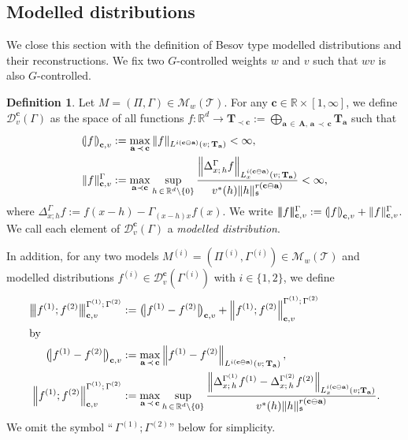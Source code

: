 \documentclass[10pt]{amsart}
\theoremstyle{definition}
\newtheorem{defi}[theo]{Definition}
\numberwithin{equation}{section}
\newcommand{\bbR}{\mathbb{R}}
\newcommand{\mfs}{\mathfrak{s}}
\newcommand{\vco}{v^*}
\newcommand{\bfa}{\mathbf{a}}
\newcommand{\bfc}{\mathbf{c}}
\newcommand{\bfcoa}{\mathbf{c}\ominus\mathbf{a}}
\newcommand{\bfA}{\mathbf{A}}
\newcommand{\bfT}{\mathbf{T}}
\newcommand{\mcD}{\mathcal{D}}
\newcommand{\scT}{\mathscr{T}}
\newcommand{\scM}{\mathscr{M}}
\newcommand{\tri}{|\!|\!|}
\newcommand{\llparenthesis}{\mathopen{(\mkern -2.7mu|}}
\newcommand{\rrparenthesis}{\mathclose{|\mkern -2.7mu)}}
\newcommand{\llbigparenthesis}{\mathopen{\big(\mkern -2.7mu\big|}}
\newcommand{\rrbigparenthesis}{\mathclose{\big|\mkern -2.7mu\big)}}
\newcommand{\lbp}{\llbigparenthesis}
\newcommand{\rbp}{\rrbigparenthesis}
\newcommand{\lp}{\llparenthesis}
\newcommand{\rp}{\rrparenthesis}
\newcommand{\bigtri}{\big|\mkern -2.7mu\big|\mkern -2.7mu\big|}
\begin{document}
\subsection{Modelled distributions}

We close this section with the definition of Besov type modelled distributions and their reconstructions. We fix two $G$-controlled weights $w$ and $v$ such that $wv$ is also $G$-controlled.


\begin{defi}\label{def:besovMD}
Let $M=(\Pi,\Gamma)\in\scM_{w}(\scT)$. For any $\bfc\in\bbR\times[1,\infty]$, we define $\mcD_{v}^\bfc(\Gamma)$ as the space of all functions $f:\bbR^d\to \bfT_{\prec \bfc}:=\bigoplus_{\bfa\,\in\,\bfA,\, \bfa\,\prec \,\bfc}\bfT_\bfa$ such that
\begin{align*}
\lp f\rp_{\bfc,v}&:=\max_{\bfa\,\prec \,\bfc}\|f\|_{L^{i(\bfcoa)}(v;\,\bfT_\bfa)}<\infty,\\
\| f\|_{\bfc,v}^\Gamma&:=\max_{\bfa\prec\bfc}
\sup_{h\,\in\,\bbR^d\setminus\{0\}}
\frac{\left\|\Delta_{x;\,h}^\Gamma f\right\|_{L_x^{i(\bfcoa)}(v;\,\bfT_\bfa)}}{\vco(h)\|h\|_\mfs^{r(\bfcoa)}}<\infty,
\end{align*}
where $\Delta_{x;h}^\Gamma f:=f(x-h)-\Gamma_{(x-h)x}f(x)$. We write $\tri f\tri_{\bfc,v}^\Gamma:=\lp f\rp_{\bfc,v}+\|f\|_{\bfc,v}^\Gamma$. We call each element of $\mcD_v^{\bfc}(\Gamma)$ a \emph{modelled distribution}.

In addition, for any two models $M^{(i)}=(\Pi^{(i)},\Gamma^{(i)})\in\scM_{w}(\scT)$ and modelled distributions $f^{(i)}\in\mcD_{v}^\bfc(\Gamma^{(i)})$ with $i\in\{1,2\}$, we define
\begin{align*}
\bigtri f^{(1)};f^{(2)}\bigtri_{\bfc,v}^{\Gamma^{(1)};\,\Gamma^{(2)}} &:=\lbp f^{(1)}-f^{(2)}\rbp_{\bfc,v}+\left\|f^{(1)};f^{(2)}\right\|_{\bfc,v}^{\Gamma^{(1)};\,\Gamma^{(2)}}
\\
\intertext{by}
\lbp f^{(1)}-f^{(2)}\rbp_{\bfc,v}&:=\max_{\bfa\,\prec \,\bfc}\left\|f^{(1)}-f^{(2)}\right\|_{L^{i(\bfcoa)}\left(v;\,\bfT_\bfa\right)},\\
\left\| f^{(1)};f^{(2)}\right\|_{\bfc,v}^{\Gamma^{(1)};\,\Gamma^{(2)}}&:=\max_{\bfa\,\prec\, \bfc}
\sup_{h\,\in\,\bbR^d\setminus\{0\}}
\frac{\left\|\Delta_{x;\,h}^{\Gamma^{(1)}} f^{(1)}-\Delta_{x;\,h}^{\Gamma^{(2)}}f^{(2)}\right\|_{L_x^{i(\bfcoa)}\left(v;\bfT_\bfa\right)}}{\vco(h)\|h\|_\mfs^{r(\bfcoa)}}.
\end{align*}
We omit the symbol ``$\,\Gamma^{(1)};\Gamma^{(2)}$'' below for simplicity.
\end{defi}
\end{document}
